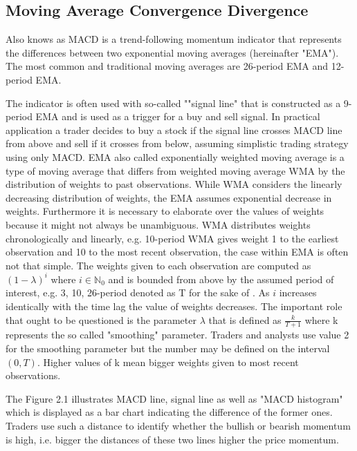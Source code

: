 \subsection{Moving Average Convergence Divergence}

Also knows as MACD is a trend-following momentum indicator that represents the differences between two exponential moving averages (hereinafter "EMA"). The most common and traditional moving averages are 26-period EMA and 12-period EMA. 

The indicator is often used with so-called ""signal line" that is constructed as a 9-period EMA and is used as a trigger for a buy and sell signal. In practical application a trader decides to buy a stock if the signal line crosses MACD line from above and sell if it crosses from below, assuming simplistic trading strategy using only MACD. EMA also called exponentially weighted moving average is a type of moving average that differs from weighted moving average WMA by the distribution of weights to past observations. While WMA considers the linearly decreasing distribution of weights, the EMA assumes exponential decrease in weights. Furthermore it is necessary to elaborate over the values of weights because it might not always be unambiguous. WMA distributes weights chronologically and linearly, e.g. 10-period WMA gives weight 1 to the earliest observation and 10 to the most recent observation, the case within EMA is often not that simple. The weights given to each observation are computed as $(1 - \lambda)^i$ where $i \in \mathbb{N}_0$ and is bounded from above by the assumed period of interest, e.g. 3, 10, 26-period denoted as T for the sake of . As $i$ increases identically with the time lag the value of weights decreases. The important role that ought to be questioned is the parameter $\lambda$ that is defined as $\frac{k}{T+1}$ where k represents the so called "smoothing" parameter. Traders and analysts use value 2 for the smoothing parameter but the number may be defined on the interval $(0,T)$. Higher values of k mean bigger weights given to most recent observations. 

The Figure 2.1 illustrates MACD line, signal line as well as "MACD histogram" which is displayed as a bar chart indicating the difference of the former ones. Traders use such a distance to identify whether the bullish or bearish momentum is high, i.e. bigger the distances of these two lines higher the price momentum.

